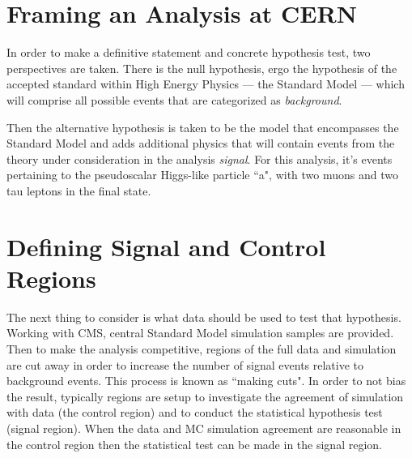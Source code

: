 \section{Framing an Analysis at CERN}
In order to make a definitive statement and concrete hypothesis test, two perspectives are taken. 
There is the null hypothesis, ergo the hypothesis of the accepted standard within High Energy Physics --- the Standard Model --- which will comprise all possible events that are categorized as \textit{background}. 


Then the alternative hypothesis is taken to be the model that encompasses the Standard Model and adds additional physics that will contain events from the theory under consideration in the analysis \textit{signal}. For this analysis, it's events pertaining to the pseudoscalar Higgs-like particle ``a", with two muons and two tau leptons in the final state. 

\section{Defining Signal and Control Regions}
The next thing to consider is what data should be used to test that hypothesis. Working with CMS, central Standard Model simulation samples are provided. Then to make the analysis competitive, regions of the full data and simulation are cut away in order to increase the number of signal events relative to background events. This process is known as ``making cuts". In order to not bias the result, typically regions are setup to investigate the agreement of simulation with data (the control region) and to conduct the statistical hypothesis test (signal region). When the data and MC simulation agreement are reasonable in the control region then the statistical test can be made in the signal region.  



